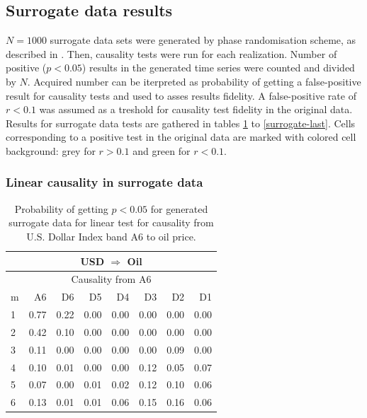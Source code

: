 \newpage
\subsection{Surrogate data results} \label{sec:results-surrogate}

$N=1000$ surrogate data sets were generated by phase randomisation scheme, as described in .
Then, causality tests were run for each realization.
Number of positive ($p < 0.05$) results in the generated time series were counted and divided by $N$.
Acquired number can be iterpreted as probability of getting a false-positive result for causality tests and used to asses results fidelity.
A false-positive rate of $r<0.1$ was assumed as a treshold for causality test fidelity in the original data.
Results for surrogate data tests are gathered in tables \ref{surrogate-first} to \ref{surrogate-last}.
Cells corresponding to a positive test in the original data are marked with colored cell background:
grey for $r>0.1$ and green for $r<0.1$.


\subsubsection{Linear causality in surrogate data}

%
%
\begin{table}[H]
\begin{center}
\begin{tabular}{l|r r r r r r r}
\hline\hline
\multicolumn{8}{c}{USD $\Rightarrow$ Oil}\\
\hline
\multicolumn{8}{c}{Causality from A6}\\
\hline\hline
m & A6 & D6 & D5 & D4 & D3 & D2 & D1 \\
\hline
1 & 0.77 & \cellcolor{mygrey}0.22 & 0.00 & 0.00 & 0.00 & 0.00 & 0.00 \\
2 & 0.42 & \cellcolor{mygrey}0.10 & 0.00 & 0.00 & 0.00 & 0.00 & 0.00 \\
3 & 0.11 & 0.00 & 0.00 & 0.00 & 0.00 & 0.09 & 0.00 \\
4 & 0.10 & 0.01 & 0.00 & 0.00 & 0.12 & 0.05 & 0.07 \\
5 & 0.07 & 0.00 & 0.01 & 0.02 & 0.12 & 0.10 & 0.06 \\
6 & 0.13 & 0.01 & 0.01 & 0.06 & 0.15 & 0.16 & 0.06 \\
\hline\hline
\end{tabular}
\caption{Probability of getting $p < 0.05$ for generated surrogate data for linear test for causality from U.S. Dollar Index band A6 to oil price.}
\label{surrogate-first}
\end{center}
\end{table}

